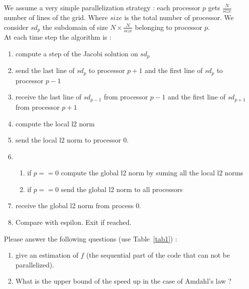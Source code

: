 \documentclass[11pt,a4paper]{article}
\begin{document}
\begin{exercise}
  $~$ %
\\

We assume a very simple parallelization strategy : each processor $p$ gets $\frac{N}{size}$ number of lines of the grid. Where $size$ is the total number of processor. We consider $sd_{p}$ the subdomain of size $N \times \frac{N}{size}$ belonging to processor $p$. 
\\

At each time step the algorithm is :

\begin{enumerate}

	\item compute a step of the Jacobi solution on $sd_{p}$

	\item send the last line of $sd_{p}$ to processor $p+1$ and the first line of $sd_{p}$ to processor $p-1$

	\item receive the last line of $sd_{p-1}$ from processor $p-1$ and the first line of $sd_{p+1}$ from processor $p+1$

	\item compute the local l2 norm

	\item send the local l2 norm to processor 0.

	\item  \begin{enumerate} \item{if $p == 0$ compute the global l2 norm by suming all the local l2 norms} \item{if $p==0$ send the global l2 norm to all processors} \end{enumerate}

	\item receive the global l2 norm from process 0. 

	\item Compare with espilon. Exit if reached. 

\end{enumerate}

Please answer the following questions (use Table~\ref{tab1}) :

\begin{enumerate}[label=(\alph*)]

	\item give an estimation of $f$ (the sequential part of the code that can not be parallelized). 

	\item What is the upper bound of the speed up in the case of Amdahl's law ? 

\end{enumerate}
  

\end{exercise}
\end{document}
